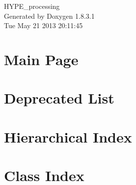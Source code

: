 \documentclass{book}
\begin{document}
\hypersetup{pageanchor=false,citecolor=blue}
\begin{titlepage}
\vspace*{7cm}
\begin{center}
{\Large H\-Y\-P\-E\-\_\-processing }\\
\vspace*{1cm}
{\large Generated by Doxygen 1.8.3.1}\\
\vspace*{0.5cm}
{\small Tue May 21 2013 20:11:45}\\
\end{center}
\end{titlepage}
\clearemptydoublepage
{}
\tableofcontents
\clearemptydoublepage
{}
\hypersetup{pageanchor=true,citecolor=blue}
\chapter{Main Page}
\label{index}\hypertarget{index}{}
\chapter{Deprecated List}
\label{deprecated}
\hypertarget{deprecated}{}

\chapter{Hierarchical Index}

\chapter{Class Index}

\end{document}
